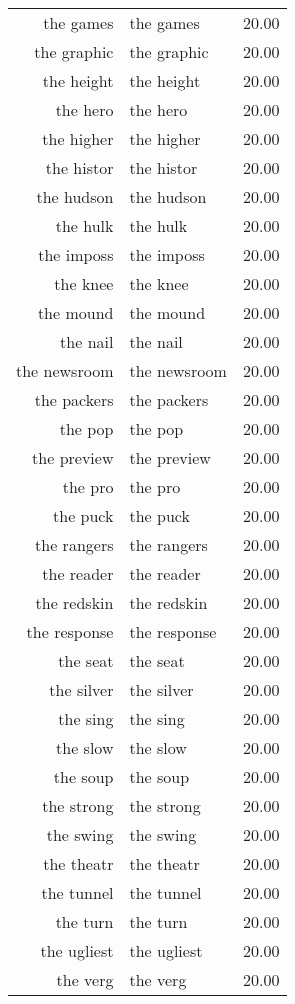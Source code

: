 \begin{table}[ht]
\begin{tabular}{rlr}
  the games & the games & 20.00 \\ 
  the graphic & the graphic & 20.00 \\ 
  the height & the height & 20.00 \\ 
  the hero & the hero & 20.00 \\ 
  the higher & the higher & 20.00 \\ 
  the histor & the histor & 20.00 \\ 
  the hudson & the hudson & 20.00 \\ 
  the hulk & the hulk & 20.00 \\ 
  the imposs & the imposs & 20.00 \\ 
  the knee & the knee & 20.00 \\ 
  the mound & the mound & 20.00 \\ 
  the nail & the nail & 20.00 \\ 
  the newsroom & the newsroom & 20.00 \\ 
  the packers & the packers & 20.00 \\ 
  the pop & the pop & 20.00 \\ 
  the preview & the preview & 20.00 \\ 
  the pro & the pro & 20.00 \\ 
  the puck & the puck & 20.00 \\ 
  the rangers & the rangers & 20.00 \\ 
  the reader & the reader & 20.00 \\ 
  the redskin & the redskin & 20.00 \\ 
  the response & the response & 20.00 \\ 
  the seat & the seat & 20.00 \\ 
  the silver & the silver & 20.00 \\ 
  the sing & the sing & 20.00 \\ 
  the slow & the slow & 20.00 \\ 
  the soup & the soup & 20.00 \\ 
  the strong & the strong & 20.00 \\ 
  the swing & the swing & 20.00 \\ 
  the theatr & the theatr & 20.00 \\ 
  the tunnel & the tunnel & 20.00 \\ 
  the turn & the turn & 20.00 \\ 
  the ugliest & the ugliest & 20.00 \\ 
  the verg & the verg & 20.00 \\ 

\end{tabular}
\end{table}
